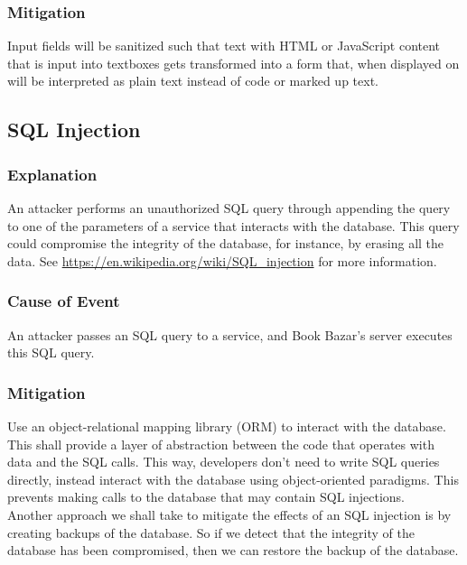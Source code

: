 \documentclass[fullpage]{article}
\begin{document}
\subsubsection*{Mitigation}
Input fields will be sanitized such that text with HTML or JavaScript content that is input into textboxes gets transformed into a form that, when displayed on will be interpreted as plain text instead of code or marked up text.

\subsection{SQL Injection}

\subsubsection*{Explanation}
An attacker performs an unauthorized SQL query through appending the query to one of the parameters of a service that interacts with the database. This query could compromise the integrity of the database, for instance, by erasing all the data. See \url{https://en.wikipedia.org/wiki/SQL_injection} for more information.

\subsubsection*{Cause of Event}
An attacker passes an SQL query to a service, and Book Bazar’s server executes this SQL query.

\subsubsection*{Mitigation}
Use an object-relational mapping library (ORM) to interact with the database. This shall provide a layer of abstraction between the code that operates with data and the SQL calls. This way, developers don’t need to write SQL queries directly, instead interact with the database using object-oriented paradigms. This prevents making calls to the database that may contain SQL injections.\\
\newline
Another approach we shall take to mitigate the effects of an SQL injection is by creating backups of the database. So if we detect that the integrity of the database has been compromised, then we can restore the backup of the database.
\begin{comment}
\begin{thebibliography}{9}

\bibitem{website}
S. Liu, “Canada most popular desktop browsers 2021,” Statista, 04-Oct-2021. [Online]. Available: https://www.statista.com/statistics/499462/most-popular-desktop-browsers-in-canada-by-market-share/. [Accessed: 17-Oct-2021]. 

\end{thebibliography}
\end{comment}
\end{document}
